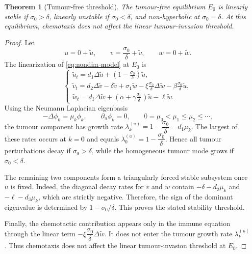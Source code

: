 \documentclass[10pt,a4paper]{amsart}
\newtheorem{theorem}{Theorem}
\begin{document}
\begin{theorem}[Tumour-free threshold]
\label{thm:tumour-free-threshold}
The tumour-free equilibrium $E_0$
is linearly stable if $\sigma_0>\delta$,
linearly unstable if $\sigma_0<\delta$,
and non-hyperbolic at $\sigma_0=\delta$.
At this equilibrium, chemotaxis does not affect the linear tumour-invasion
threshold.
\end{theorem}

\begin{proof}
Let
\[
u=0+\widetilde u,\qquad
v=\frac{\sigma_0}{\delta}+\widetilde v,\qquad
w=0+\widetilde w.
\]
The linearization of \eqref{eq:nondim-model} at $E_0$ is
\begin{equation}\label{eq:tumour-free-linearization}
\begin{cases}
\widetilde u_t=
d_1\Delta \widetilde u+
\left(1-\frac{\sigma_0}{\delta}\right)\widetilde u,\\[2pt]
\widetilde v_t=
d_2\Delta \widetilde v-\delta\widetilde v
+\sigma_1\widetilde w
-\xi\frac{\sigma_0}{\delta}\Delta\widetilde w
-\beta\frac{\sigma_0}{\delta}\widetilde u,\\[2pt]
\widetilde w_t=
d_3\Delta \widetilde w+
\left(\alpha+\gamma\frac{\sigma_0}{\delta}\right)\widetilde u
-\ell\widetilde w .
\end{cases}
\end{equation}
Using the Neumann Laplacian eigenbasis
\[
-\Delta\phi_k=\mu_k\phi_k,\qquad
\partial_n\phi_k=0,
\qquad
0=\mu_0<\mu_1\le\mu_2\le\cdots,
\]
the tumour component has growth rate
$\lambda_k^{(u)}
=
1-\dfrac{\sigma_0}{\delta}-d_1\mu_k$.
The largest of these rates occurs at $k=0$ and equals
$\lambda_0^{(u)}=1-\dfrac{\sigma_0}{\delta}$.
Hence all tumour perturbations decay if $\sigma_0>\delta$, while the homogeneous
tumour mode grows if $\sigma_0<\delta$.

The remaining two components form a triangularly forced stable subsystem once
$\widetilde u$ is fixed. Indeed, the diagonal decay rates for
$\widetilde v$ and $\widetilde w$ contain $-\delta-d_2\mu_k$ and
$-\ell-d_3\mu_k$, which are strictly negative. Therefore, the sign of the
dominant eigenvalue is determined by
$1-\sigma_0/\delta$. This proves the stated stability threshold.

Finally, the chemotactic contribution appears only in the immune equation
through the linear term
$-\xi\dfrac{\sigma_0}{\delta}\Delta\widetilde w$.
It does not enter the tumour growth rate
$\lambda_k^{(u)}$. Thus chemotaxis does not affect the linear
tumour-invasion threshold at $E_0$.
\end{proof}
\end{document}
